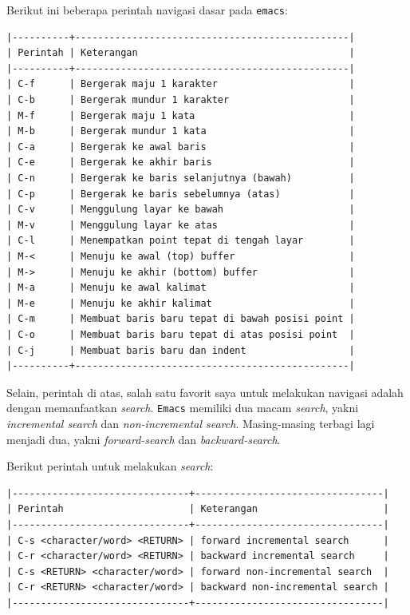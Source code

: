 \documentclass{article}
\begin{document}
Berikut ini beberapa perintah navigasi dasar pada \verb=emacs=:

\begin{verbatim}
|----------+------------------------------------------------|
| Perintah | Keterangan                                     |
|----------+------------------------------------------------|
| C-f      | Bergerak maju 1 karakter                       |
| C-b      | Bergerak mundur 1 karakter                     |
| M-f      | Bergerak maju 1 kata                           |
| M-b      | Bergerak mundur 1 kata                         |
| C-a      | Bergerak ke awal baris                         |
| C-e      | Bergerak ke akhir baris                        |
| C-n      | Bergerak ke baris selanjutnya (bawah)          |
| C-p      | Bergerak ke baris sebelumnya (atas)            |
| C-v      | Menggulung layar ke bawah                      |
| M-v      | Menggulung layar ke atas                       |
| C-l      | Menempatkan point tepat di tengah layar        |
| M-<      | Menuju ke awal (top) buffer                    |
| M->      | Menuju ke akhir (bottom) buffer                |
| M-a      | Menuju ke awal kalimat                         |
| M-e      | Menuju ke akhir kalimat                        |
| C-m      | Membuat baris baru tepat di bawah posisi point |
| C-o      | Membuat baris baru tepat di atas posisi point  |
| C-j      | Membuat baris baru dan indent                  |
|----------+------------------------------------------------|
\end{verbatim}

Selain, perintah di atas, salah satu favorit saya untuk melakukan navigasi 
adalah dengan memanfaatkan \emph{search}. \verb=Emacs= memiliki dua 
macam \emph{search}, yakni \emph{incremental search} dan 
\emph{non-incremental search}. Masing-masing terbagi lagi
menjadi dua, yakni \emph{forward-search} dan \emph{backward-search}.

Berikut perintah untuk melakukan \emph{search}:

\begin{verbatim}
|-------------------------------+---------------------------------|
| Perintah                      | Keterangan                      |
|-------------------------------+---------------------------------|
| C-s <character/word> <RETURN> | forward incremental search      |
| C-r <character/word> <RETURN> | backward incremental search     |
| C-s <RETURN> <character/word> | forward non-incremental search  |
| C-r <RETURN> <character/word> | backward non-incremental search |
|-------------------------------+---------------------------------|
\end{verbatim}
\end{document}
